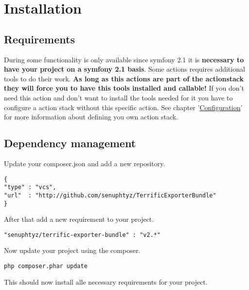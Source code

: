 
\section{Installation}


\subsection{Requirements}
During some functionality is only available since symfony 2.1 it is \textbf{necessary to have your project on a symfony 2.1 basis}. Some actions requires additional tools to do their work. \textbf{As long as this actions are part of the actionstack they will force you to have this tools installed and callable!} If you don't need this action and don't want to install the tools needed for it you have to configure a action stack without this specific action. See chapter '\mbox{\hyperlink{chap-Configuration}{Configuration}}' for more information about defining you own action stack.

\subsection{Dependency management}
Update your composer.json and add a new repository. \\

\begin{verbatim}
{
"type" : "vcs",
"url"  : "http://github.com/senuphtyz/TerrificExporterBundle"
}
\end{verbatim}

\noindent After that add a new requirement to your project. \\

\begin{verbatim}
"senuphtyz/terrific-exporter-bundle" : "v2.*"
\end{verbatim}
\noindent Now update your project using the composer. \\

\begin{verbatim}
php composer.phar update
\end{verbatim}
\noindent This should now install alle necessary requirements for your project. \\


